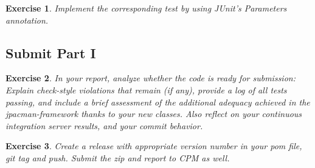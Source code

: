 \documentclass[a4paper]{article}
\newtheorem{thm}{Exercise}
\begin{document}
    \begin{thm}
      Implement the corresponding test by using JUnit’s Parameters annotation.
    \end{thm}
    
  
  \subsection{Submit Part I}
    \begin{thm}
      In your report, analyze whether the code is ready for submission: Explain check-style violations that remain (if any), provide a log of all tests passing, and include a brief assessment of the additional adequacy achieved in the jpacman-framework thanks to your new classes. Also reflect on your continuous integration server results, and your commit behavior.
    \end{thm}
    
    
    \begin{thm}
      Create a release with appropriate version number in your pom file, git tag and push. Submit the zip and report to CPM as well.
    \end{thm}
    
\end{document}
